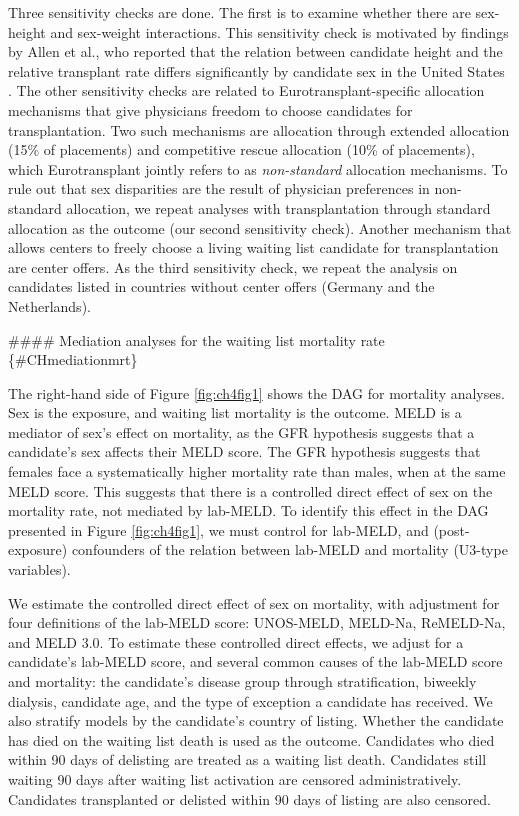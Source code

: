 \documentclass[11pt,twoside,]{book}
\begin{document}
Three sensitivity checks are done. The first is to examine whether
there are sex-height and sex-weight interactions. This sensitivity check is motivated by
findings by Allen et al., who reported that the relation between candidate
height and the relative transplant rate differs significantly by candidate sex
in the United States \citep{allenReducedAccessLiver2018}. The other sensitivity
checks are related to Eurotransplant-specific allocation mechanisms that give physicians freedom to
choose candidates for transplantation. Two such mechanisms are allocation
through extended allocation (15\% of placements) and competitive rescue
allocation (10\% of placements), which Eurotransplant jointly refers to as \emph{non-standard}
allocation mechanisms. To rule out that sex disparities
are the result of physician preferences in non-standard allocation, we
repeat analyses with transplantation through standard allocation as
the outcome (our second sensitivity check). Another mechanism that
allows centers to freely choose a living waiting list candidate for transplantation
are center offers. As the third sensitivity check, we repeat the analysis on candidates listed in
countries without center offers (Germany and the Netherlands).

\newpage
\#\#\#\# Mediation analyses for the waiting list mortality rate \{\#CHmediationmrt\}

The right-hand side of Figure \ref{fig:ch4fig1} shows the DAG for mortality analyses.
Sex is the exposure, and waiting list mortality is the outcome. MELD is a mediator
of sex's effect on mortality, as the GFR hypothesis suggests that a candidate's
sex affects their MELD score. The GFR hypothesis suggests that females face a
systematically higher mortality rate than males, when at the same MELD score.
This suggests that there is a controlled direct effect of sex on the mortality rate,
not mediated by lab-MELD. To identify this effect in the DAG presented in Figure
\ref{fig:ch4fig1}, we must control for lab-MELD, and (post-exposure)
confounders of the relation between lab-MELD and mortality (U3-type variables).

We estimate the controlled direct effect of sex on mortality, with
adjustment for four definitions of the lab-MELD score: UNOS-MELD, MELD-Na,
ReMELD-Na, and MELD 3.0. To estimate these controlled direct effects,
we adjust for a candidate's lab-MELD score, and several common causes of the
lab-MELD score and mortality: the candidate's disease group through stratification,
biweekly dialysis, candidate age, and the type of exception a candidate has
received. We also stratify models by the candidate's country of listing.
Whether the candidate has died on the waiting list death is used as the outcome.
Candidates who died within 90 days of delisting are treated as a waiting list
death. Candidates still waiting 90 days after waiting list activation are censored
administratively. Candidates transplanted or delisted within 90 days of listing
are also censored.
\end{document}
